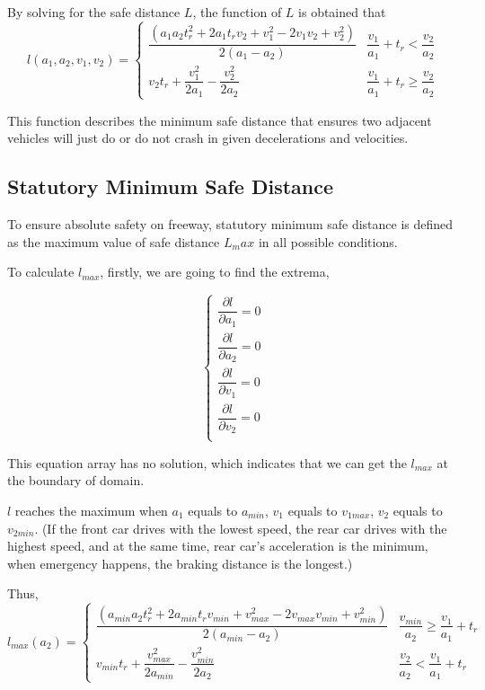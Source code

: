 By solving for the safe distance $ L $, the function of 
$ L $ is obtained that 
\begin{equation}
l(a_1, a_2, v_1, v_2) = 
\left \{
\begin{array}{cl}
\dfrac{(a_1a_2t_r^2 + 2a_1t_rv_2 + v_1^2 - 2v_1v_2 + 
v_2^2)}{2(a_1-a_2)} & 
\dfrac{v_1}{a_1} + t_r < \dfrac{v_2}{a_2}\\
v_2 t_r + \dfrac{v_1 ^ 2}{2a_1} -\dfrac{v_2^2}{2a_2} & 
\dfrac{v_1}{a_1} + t_r \geq \dfrac{v_2}{a_2}
\end{array}
\right .
\end{equation}

This function describes the minimum safe distance that 
ensures two adjacent vehicles will just do or do not 
crash in given decelerations and velocities.


\subsection{Statutory Minimum Safe Distance}

To ensure absolute safety on freeway, statutory minimum 
safe distance is defined as the maximum value of safe 
distance $ L_max $ in all possible conditions. 


To calculate  $l_{max}$, firstly, we are going to find the extrema,

\begin{displaymath}
\left \{
\begin{array}{cl}
\dfrac{\partial l}{\partial{a_1}} = 0 \\
\dfrac{\partial l}{\partial{a_2}} = 0 \\
\dfrac{\partial l}{\partial{v_1}} = 0 \\
\dfrac{\partial l}{\partial{v_2}} = 0 \\
\end{array}
\right .
\end{displaymath}

This equation array has no solution, which indicates that we can 
get the $l_{max}$ at the boundary of domain.

$l$ reaches the maximum when $a_1$ equals to $a_{min}$, { }$v_1$ 
equals to $v_{1max}$, $v_2$ equals to $v_{2min}$. (If the front 
car drives with the lowest speed, the rear car drives with the 
highest speed, and at the same time, rear car's acceleration is 
the minimum, when emergency happens, the braking distance is 
the longest.)

Thus,
\begin{displaymath}
l_{max}(a_2) = 
\left \{
\begin{array}{cl}
\dfrac{(a_{min}a_2t_r^2 + 2a_{min}t_rv_{min} + v_{max}^2 - 2v_{max}v_{min} + v_{min}^2)}{2(a_{min}-a_2)} & \dfrac{v_{min}}{a_2}  \geq \dfrac{v_1}{a_1} + t_r \\
v_{min} t_r + \dfrac{v_{max} ^ 2}{2a_{min}} -\dfrac{v_{min}^2}{2a_2} & \dfrac{v_2}{a_2}  < \dfrac{v_1}{a_1} + t_r
\end{array}
\right .
\end{displaymath}\\

